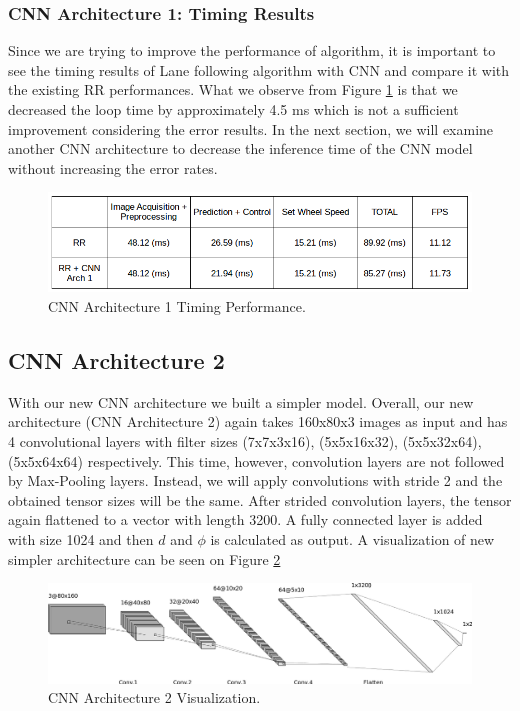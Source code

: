 \documentclass[11pt,letterpaper]{article}
\begin{document}
	\subsubsection{CNN Architecture 1: Timing Results}
	Since we are trying to improve the performance of algorithm, it is important to see the timing results of Lane following algorithm with CNN and compare it with the existing RR performances. What we observe from Figure \ref{fig:07} is that we decreased the loop time by approximately 4.5 ms which is not a sufficient improvement considering the error results. In the next section, we will examine another CNN architecture to decrease the inference time of the CNN model without increasing the error rates. 
	
	\begin{figure}[h!]
		\centering
		\includegraphics[width=0.7\linewidth]{time-arc1.png}
		\caption{CNN Architecture 1 Timing Performance.}
		\label{fig:07}
	\end{figure}
	
	\subsection{CNN Architecture 2}
	With our new CNN architecture we built a simpler model. Overall, our new architecture (CNN Architecture 2) again takes 160x80x3 images as input and has 4 convolutional layers with filter sizes (7x7x3x16), (5x5x16x32), (5x5x32x64), (5x5x64x64) respectively. This time, however, convolution layers are not followed by Max-Pooling layers. Instead, we will apply convolutions with stride 2 and the obtained tensor sizes will be the same. After  strided convolution layers, the tensor again flattened to a vector with length 3200. A fully connected layer is added with size 1024 and then $d$ and $\phi$ is calculated as output. A visualization of new simpler architecture can be seen on Figure \ref{fig:08}
	
	\begin{figure}[h!]
		\centering
		\includegraphics[width=1.0\linewidth]{arc2.png}
		\caption{CNN Architecture 2 Visualization.}
		\label{fig:08}
	\end{figure}
	
\end{document}
